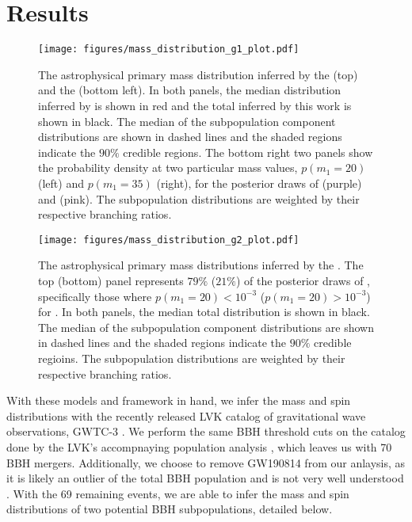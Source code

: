 \section{Results} \label{sec:results}

\begin{figure*}[ht!]
    \begin{centering}
        \texttt{[image: figures/mass\_distribution\_g1\_plot.pdf]}
        \caption{The astrophysical primary mass distribution inferred by the \base{} (top) and the \comp{} (bottom left). In both panels, the median distribution inferred by \brucepaper is shown in red and the total inferred by this work is shown in black. The median of the subpopulation component distributions are shown in dashed lines and the shaded regions indicate the $90\%$ credible regions. The bottom right two panels show the probability density at two particular mass values, $p(m_1 = 20)$ (left) and $p(m_1 = 35)$ (right), for the posterior draws of \contA{} (purple) and \contB{} (pink). The subpopulation distributions are weighted by their respective branching ratios.}
        \label{fig:g1_mass_distribution}
    \end{centering}
\end{figure*}

\begin{figure*}[ht!]
    \begin{centering}
        \texttt{[image: figures/mass\_distribution\_g2\_plot.pdf]}
        \caption{The astrophysical primary mass distributions inferred by the \comp{}. The top (bottom) panel represents $79\%$ ($21\%$) of the posterior draws of \comp{}, specifically those where $p(m_1 = 20) < 10^{-3}$ ($p(m_1 = 20) > 10^{-3}$) for \contB{}. In both panels, the median total distribution is shown in black. The median of the subpopulation component distributions are shown in dashed lines and the shaded regions indicate the $90\%$ credible regioins. The subpopulation distributions are weighted by their respective branching ratios.}
        \label{fig:g2_mass_distribution}
    \end{centering}
\end{figure*}

With these models and framework in hand, we infer the mass and spin distributions with the recently released LVK catalog of gravitational wave observations, GWTC-3 \citet{2021arXiv211103606T}. We perform the same BBH threshold cuts on the catalog done by the LVK's accompnaying population analysis \othreea{}, which leaves us with 70 BBH mergers. Additionally, we choose to remove GW190814 from our anlaysis, as it is likely an outlier of the total BBH population and is not very well understood \citep{2109.00418,2010.14533,2111.03634}. With the 69 remaining events, we are able to infer the mass and spin distributions of two potential BBH subpopulations, detailed below. 


